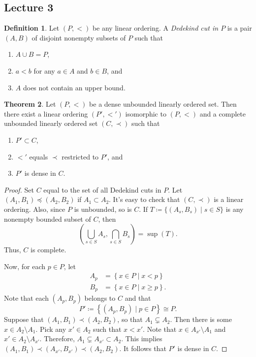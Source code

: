 \documentclass[10pt,letterpaper,cm]{nupset}
\theoremstyle{definition}
\newtheorem{definition}{Definition}[subsection]
\theoremstyle{theorem}
\newtheorem{theorem}[definition]{Theorem}
\theoremstyle{remark}
\newcommand{\1}{\mathbf{1}}
\newcommand{\0}{\vec 0}
\begin{document}
\subsection{Lecture 3}

\begin{definition}
Let  $\left(P, <\right)$ be any linear ordering. A \textit{Dedekind cut in $P$} is a pair $\left(A, B\right)$ of disjoint nonempty subsets of $P$ such that
\begin{enumerate}[label=(\alph*)]
\item $A \cup B = P$,
\item $a<b$ for any $a\in A$ and $b \in B$, and
\item $A$ does not contain an upper bound.
\end{enumerate}
\end{definition}

\begin{theorem}
Let $\left(P, <\right)$ be a dense unbounded linearly ordered set. Then there exist a linear ordering $\left(P', <'\right)$ isomorphic to $\left(P, <\right)$ and a complete unbounded linearly ordered set $\left(C, \prec\right)$ such that
\begin{enumerate}[label=(\alph*)]
\item $P' \subset C$,
\item $<'$ equals $\prec$ restricted to $P'$, and
\item $P'$ is dense in $C$.
\end{enumerate}
\end{theorem}
\begin{proof}
Set $C$ equal to the set of all Dedekind cuts in $P$. Let $\left(A_1, B_1\right)\preceq \left(A_2, B_2\right)$ if $A_1\subset A_2$. It's easy to check that $\left(C, \prec\right)$ is  a linear ordering. Also, since $P$ is unbounded, so is $C$. If $T\coloneqq \{(A_s, B_s) \mid s\in S\}$ is any nonempty bounded subset of $C$, then $$\left(\bigcup_{s\in S} A_s, \bigcap_{s\in S} B_s\right) = \sup(T).$$ Thus, $C$ is complete. 

\smallskip

Now, for each $p\in P$, let 
\begin{align*}
A_p & = \left\{x\in P \mid x<p\right\}
\\ B_p & = \left\{x\in P \mid x\geq p\right\}.
\end{align*}
Note that each $\left(A_p, B_p\right)$ belongs to $C$ and that $$P' \coloneqq \left\{(A_p, B_p) \mid p\in P\right\} \cong P.$$ Suppose that $\left(A_1, B_1\right) \prec \left(A_2, B_2\right)$, so that $A_1 \subsetneq A_2$. Then there is some $x\in A_2 \setminus A_1$. Pick any $x' \in A_2$ such that $x<x'$. Note that $x\in A_{x'} \setminus A_1$ and $x'\in A_2\setminus A_{x'}$. Therefore, $A_1 \subsetneq A_{x'} \subset A_2$. This implies $\left(A_1, B_1\right) \prec \left(A_{x'}, B_{x'}\right) \prec \left(A_2, B_2\right)$. It follows that $P'$ is dense in $C$. 
\end{proof}
\end{document}
